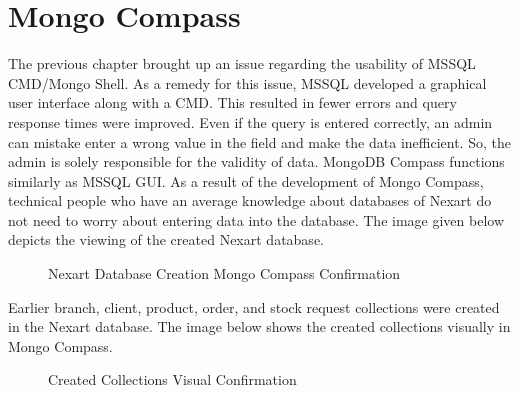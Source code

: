 \documentclass[a4Paper,12pt]{report}
\begin{document}
\section{Mongo Compass}
The previous chapter brought up an issue regarding the usability of MSSQL CMD/Mongo Shell. As a remedy for this issue, MSSQL developed a graphical user interface along with a CMD. This resulted in fewer errors and query response times were improved. Even if the query is entered correctly, an admin can mistake enter a wrong value in the field and make the data inefficient. So, the admin is solely responsible for the validity of data. MongoDB Compass functions similarly as MSSQL GUI. As a result of the development of Mongo Compass, technical people who have an average knowledge about databases of Nexart do not need to worry about entering data into the database. The image given below depicts the viewing of the created Nexart database.
\begin{figure}[H]
\centering
{}
\caption{Nexart Database Creation Mongo Compass Confirmation}
\end{figure}
Earlier branch, client, product, order, and stock request collections were created in the Nexart database. The image below shows the created collections visually in Mongo Compass.
\begin{figure}[H]
\centering
{}
\caption{Created Collections Visual Confirmation}
\end{figure}
\end{document}
